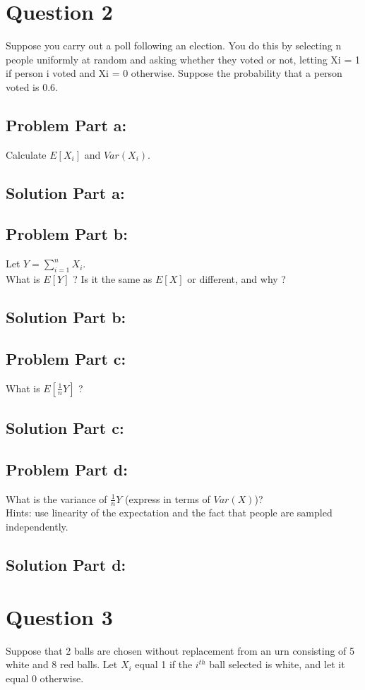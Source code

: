\documentclass[12pt]{article}%
\begin{document}
\newpage
\section*{Question 2}
Suppose you carry out a poll following an election. You do this by selecting n people uniformly at random and asking whether they voted or not, letting Xi = 1 if person i voted and Xi = 0 otherwise. Suppose the probability that a person voted is 0.6.
\subsection*{Problem Part a:}
Calculate $E[X_i]$ and $Var(X_i)$. \\ 
\subsection*{Solution Part a:}

\subsection*{Problem Part b:}
Let $Y = \sum_{i=1}^{n} X_i$. \\
What is $E[Y]$ ? Is it the same as $E[X]$ or different, and why ?
\subsection*{Solution Part b:}

\subsection*{Problem Part c:}
What is $E[\frac{1}{n}Y]$ ?
\subsection*{Solution Part c:}

\subsection*{Problem Part d:}
What is the variance of $\frac{1}{n}Y$ (express in terms of $Var(X)$)? \\
Hints: use linearity of the expectation and the fact that people are sampled independently.
\subsection*{Solution Part d:}

\newpage
\section*{Question 3}
Suppose that 2 balls are chosen without replacement from an urn consisting of 5 white and 8 red balls. Let $X_i$ equal 1 if the $i^{th}$ ball selected is white, and let it equal 0 otherwise.
\end{document}
